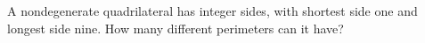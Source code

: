 A nondegenerate quadrilateral has integer sides, with shortest side one and longest side nine. How many different perimeters can it have?
